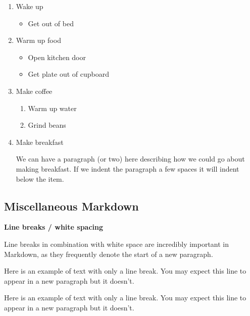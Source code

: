 \documentclass[]{tufte-book}
\newenvironment{Shaded}{\begin{snugshade}}{\end{snugshade}}
\newcommand{\NormalTok}[1]{#1}
\providecommand{\tightlist}{%
  \setlength{\itemsep}{0pt}\setlength{\parskip}{0pt}}
\begin{document}
\begin{enumerate}
\def\labelenumi{\arabic{enumi}.}
\item
  Wake up

  \begin{itemize}
  \tightlist
  \item
    Get out of bed
  \end{itemize}
\item
  Warm up food

  \begin{itemize}
  \tightlist
  \item
    Open kitchen door
  \item
    Get plate out of cupboard
  \end{itemize}
\item
  Make coffee

  \begin{enumerate}
  \def\labelenumii{\roman{enumii}.}
  \tightlist
  \item
    Warm up water
  \item
    Grind beans
  \end{enumerate}
\item
  Make breakfast

  We can have a paragraph (or two) here describing how we could go about making breakfast. If we indent the paragraph a few spaces it will indent below the item.
\end{enumerate}

\hypertarget{miscellaneous-markdown}{%
\subsection{Miscellaneous Markdown}\label{miscellaneous-markdown}}

\textbf{Line breaks / white spacing}

Line breaks in combination with white space are incredibly important in Markdown, as they frequently denote the start of a new paragraph.

\begin{Shaded}
\begin{Highlighting}[]
\NormalTok{Here is an example of text with only a line break.}
\NormalTok{You may expect this line to appear in a new paragraph but it doesn't.}
\end{Highlighting}
\end{Shaded}

Here is an example of text with only a line break.
You may expect this line to appear in a new paragraph but it doesn't.
\end{document}
